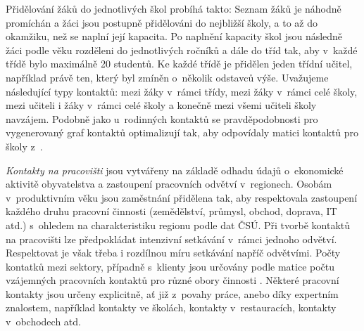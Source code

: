 Přidělování žáků do jednotlivých škol probíhá takto: Seznam žáků je náhodně promíchán a žáci jsou postupně přidělováni do nejbližší školy, a to až do okamžiku, než se naplní její kapacita. Po naplnění kapacity škol jsou následně žáci podle věku rozděleni do jednotlivých ročníků a dále do tříd tak, aby v~každé třídě bylo maximálně 20 studentů. Ke každé třídě je přidělen jeden třídní učitel, například právě ten, který byl zmíněn o~několik odstavců výše. 
Uvažujeme následující typy kontaktů: mezi žáky v~rámci třídy, mezi žáky v~rámci celé školy, mezi učiteli i žáky v~rámci celé školy a konečně mezi všemi učiteli školy navzájem.
Podobně jako u~rodinných kontaktů se pravděpodobnosti pro vygenerovaný graf kontaktů optimalizují tak, aby odpovídaly matici kontaktů pro školy z~\cite{Prem_etal2017}.



\emph{Kontakty na pracovišti} jsou vytvářeny na základě odhadu údajů o~ekonomické aktivitě obyvatelstva a zastoupení pracovních odvětví v~regionech. Osobám v~produktivním věku jsou zaměstnání přidělena tak, aby respektovala zastoupení každého druhu pracovní činnosti (zemědělství, průmysl, obchod, doprava, IT atd.) s~ohledem na charakteristiku regionu podle dat ČSÚ. Při tvorbě kontaktů na pracovišti lze předpokládat intenzivní setkávání v~rámci jednoho odvětví. Respektovat je však třeba i rozdílnou míru setkávání napříč odvětvími. Počty kontatků mezi sektory, případně s~klienty jsou určovány podle matice počtu vzájemných pracovních kontaktů pro různé obory činnosti \cite{Prem_etal2017}. Některé pracovní kontakty jsou určeny explicitně, ať již z~povahy práce, anebo díky expertním znalostem, například kontakty ve školách, kontakty v~restauracích, kontakty v~obchodech atd.


